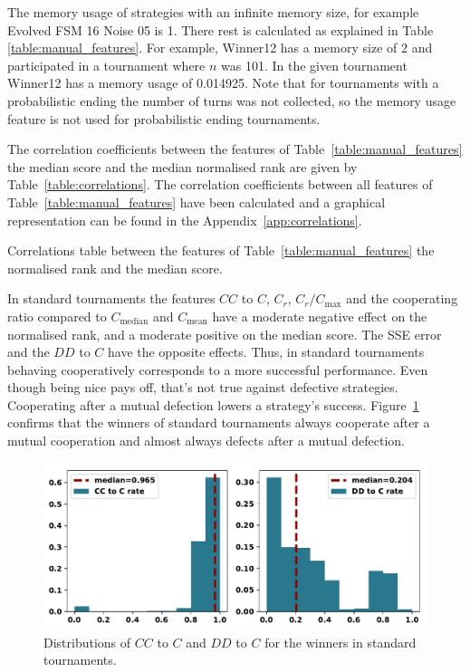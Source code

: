 \documentclass{article}
\begin{document}
The memory usage of strategies with an infinite memory size, for example Evolved
FSM 16 Noise 05 is 1. There rest is calculated as explained in Table
\ref{table:manual_features}. For example,  Winner12 has a memory size of 2 and
participated in a tournament where $n$ was 101. In the given tournament Winner12
has a memory usage of 0.014925. Note that for tournaments with a probabilistic
ending the number of turns was not collected, so the memory usage feature is not
used for probabilistic ending tournaments.

The correlation coefficients between the features of
Table~\ref{table:manual_features} the median score and the median normalised
rank are given by Table~\ref{table:correlations}. The correlation coefficients
between all features of Table~\ref{table:manual_features} have been calculated
and a graphical representation can be found in the
Appendix~\ref{app:correlations}.

\begin{table}[!htbp]
    \begin{center}
    \resizebox{.9\textwidth}{!}{
        
    }
\end{center}
\caption{Correlations table between the features of Table~\ref{table:manual_features}
the normalised rank and the median score.}\label{table:correlations}
\end{table}

In standard tournaments the features  $CC$ to $C$, $C_r$, $C_r / C_{\text{max}}$
and the cooperating ratio compared to $C_{\text{median}}$ and $C_{\text{mean}}$
have a moderate negative effect on the normalised rank, and a moderate positive
on the median score. The SSE error and the $DD$ to $C$ have the opposite
effects. Thus, in standard tournaments behaving cooperatively corresponds to a
more successful performance. Even though being nice pays off,
that's not true against defective strategies. Cooperating after a mutual
defection lowers a strategy's success.
Figure~\ref{fig:rates_of_winners_in_standard_tournaments} confirms that the
winners of standard tournaments always cooperate after a mutual cooperation and
almost always defects after a mutual defection.

\begin{figure}[!htbp]
    \centering
    \includegraphics[width=.57\textwidth]{../images/rates_of_winners_in_standard_tournaments.pdf}
    \caption{Distributions of $CC$ to $C$ and $DD$ to $C$ for the winners in
    standard tournaments.}\label{fig:rates_of_winners_in_standard_tournaments}
\end{figure}
\end{document}
